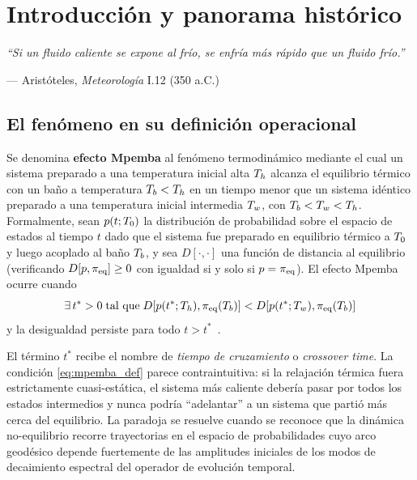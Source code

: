 \chapter{Introducción y panorama histórico}
\label{ch:introduccion}

\epigraph{\emph{``Si un fluido caliente se expone al frío, se enfría más rápido que un fluido frío.''}}
{--- Aristóteles, \emph{Meteorología} I.12 (350 a.C.)}

\section{El fenómeno en su definición operacional}

Se denomina \textbf{efecto Mpemba} al fenómeno termodinámico mediante el cual un 
sistema preparado a una temperatura inicial alta $T_{h}$ alcanza el equilibrio térmico 
con un baño a temperatura $T_{b} < T_{h}$ en un tiempo menor que un sistema idéntico 
preparado a una temperatura inicial intermedia $T_{w}$, con $T_{b} < T_{w} < T_{h}$. 
Formalmente, sean $p(t;T_{0})$ la distribución de probabilidad sobre el espacio de 
estados al tiempo $t$ dado que el sistema fue preparado en equilibrio térmico a 
$T_{0}$ y luego acoplado al baño $T_{b}$, y sea $D[\cdot,\cdot]$ una función de 
distancia al equilibrio (verificando $D[p,\pi_{\mathrm{eq}}] \ge 0$ con igualdad si y solo si 
$p = \pi_{\mathrm{eq}}$). El efecto Mpemba ocurre cuando
\begin{equation}
    \exists\, t^{\ast} > 0 \;\text{tal que}\; 
    D\!\left[p(t^{\ast};T_{h}),\pi_{\mathrm{eq}}(T_{b})\right] 
    < D\!\left[p(t^{\ast};T_{w}),\pi_{\mathrm{eq}}(T_{b})\right]
    \label{eq:mpemba_def}
\end{equation}
y la desigualdad persiste para todo $t > t^{\ast}$~\cite{lu2017}.

El término $t^{\ast}$ recibe el nombre de \emph{tiempo de cruzamiento} o 
\emph{crossover time}. La condición \cref{eq:mpemba_def} parece contraintuitiva: si la 
relajación térmica fuera estrictamente cuasi-estática, el sistema más caliente 
debería pasar por todos los estados intermedios y nunca podría ``adelantar'' a un 
sistema que partió más cerca del equilibrio. La paradoja se resuelve cuando se 
reconoce que la dinámica no-equilibrio recorre trayectorias en el espacio de 
probabilidades cuyo arco geodésico depende fuertemente de las amplitudes iniciales de 
los modos de decaimiento espectral del operador de evolución temporal.

